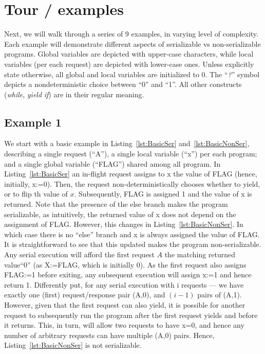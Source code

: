 \newpage


\section{Tour / examples}
\label{sec:tour}

Next, we will walk through a series of 9 examples, in varying level of complexity. Each example will demonstrate different aspects of serializable vs non-serializable programs.
%
Global variables are depicted with upper-case characters, while local variables (per each request) are depicted with lower-case ones.
%
Unless explicitly state otherwise, all global and local variables are initialized to 0.
%
The ``\textit{?}'' symbol depicts a nondeterministic choice between ``0'' and ``1''. All other constructs (\textit{while}, \textit{yield} \textit{if}) are in their regular meaning.

\subsection{Example 1}


We start with a basic example in Listing~\ref{lst:BasicSer} and~\ref{lst:BasicNonSer}, describing a single request (``A''), a single local variable (``x'') per each program; and a single global variable (``FLAG'') shared among all program. 
%
In Listing~\ref{lst:BasicSer} an in-flight request assigns to x the value of FLAG (hence, initially, x:=0). Then, the request non-deterministically chooses whether to yield, or to flip th value of $x$. Subsequently, FLAG is assigned 1 and the value of x is returned. 
%
Note that the presence of the else branch makes the program serializable, as intuitively, the returned value of x does not depend on the assignment of FLAG.
%
However, this changes in  Listing~\ref{lst:BasicNonSer}. In which case there is no ``else'' branch and x is always assigned the value of FLAG.
%
It is straightforward to see that this updated makes the program non-serializable. Any serial execution will afford the first request $A$ the matching returned value``0'' (as X:=FLAG, which is initially 0). As the first request also assigns FLAG:=1 before exiting, any subsequent execution will assign x:=1 and hence return 1. Differently put, for any serial execution with i requests --- we have exactly one (first) request/response pair (A,0), and $(i-1)$ pairs of (A,1).
%
However, given that the first request can also yield, it is possible for another request to subsequently run the program after the first request yields and before it returns. This, in turn, will allow two requests to have x=0, and hence any number of arbitrary requests can have multiple (A,0) pairs. Hence, Listing~\ref{lst:BasicNonSer} is not serializable.




